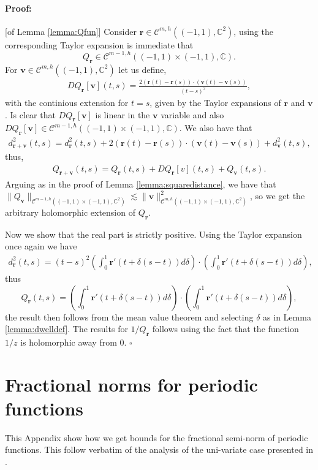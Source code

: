 \documentclass{article}
\newenvironment{proof}{\paragraph{Proof:}}{\hfill$\square$}
\newcommand{\IC}{{\mathbb C}}
\newcommand{\cmspaceh}[4]{\mathcal{C}^{#1,#2} \left( #3, #4 \right)}
\newcommand{\bv}{\bm{v}}
\newcommand{\br}{\bm{r}}
\newcommand{\iinterv}{(-1,1)\times(-1,1)}
\begin{document}
\begin{proof}[of Lemma \ref{lemma:Qfun}]
Consider $\br \in \cmspaceh{m}{h}{(-1,1)}{\IC^2}$, using the corresponding Taylor expansion is immediate that  $$Q_{\br} \in \cmspaceh{m-1}{h}{(-1,1)\times(-1,1)}{\IC}.$$  For $\bv \in \cmspaceh{m}{h}{(-1,1)}{\IC^2}$ let us define,
\begin{align*}
DQ_{\br}[\bv](t,s) = \frac{2 (\br(t)-\br(s))\cdot (\bv(t)-\bv(s))}{(t-s)^2}, 
\end{align*}
with the continious extension for $t=s$, given by the Taylor expansions of $\br$ and $\bv$. Is clear that $DQ_{\br}[\bv]$ is linear in the $\bv$ variable and also $DQ_{\br}[\bv] \in \cmspaceh{m-1}{h}{(-1,1)\times(-1,1)}{\IC}$. We also have that 
\begin{align*}
d_{\br +\bv}^2(t,s) = d^2_{\br}(t,s) + 2 (\br(t) -\br(s))\cdot (\bv(t)-\bv(s)) + d_{\bv}^2(t,s),
\end{align*}
thus, 
\begin{align*}
Q_{\br +\bv}(t,s) = Q_{\br}(t,s) + DQ_{\br}[v](t,s) + Q_{\bv}(t,s).
\end{align*}
Arguing as in the proof of Lemma \ref{lemma:squaredistance}, 
we have that $\| Q_{\bv}\|_{\cmspaceh{m-1}{h}{\iinterv}{\IC^2}} \lesssim \| \bv\|_{\cmspaceh{m}{h}{\iinterv}{\IC^2}}^2$, so we get the arbitrary holomorphic extension of $Q_{\br}$.

Now we show that the real part is strictly positive. Using the Taylor expansion once again we have 
\begin{align*}
d_{\br}^2(t,s) = (t-s)^2 \left(\int_{0}^1 \br'(t+\delta(s-t))d\delta \right) \cdot \left(\int_{0}^1 \br'(t+\delta(s-t))d\delta \right),
\end{align*}
thus 
$$
Q_{\br}(t,s) = \left(\int_{0}^1 \br'(t+\delta(s-t))d\delta \right) \cdot \left(\int_{0}^1 \br'(t+\delta(s-t))d\delta \right),
$$
the result then follows from the mean value theorem and selecting $\delta$ as in Lemma \ref{lemma:dwelldef}. The results for $1/Q_{\br}$  follows using the fact that the function $1/z$ is holomorphic away from 0.
\end{proof}

\section{Fractional norms for periodic functions}
\label{appendix:fracbivariate}
This Appendix show how we get bounds for the fractional semi-norm of periodic functions. This follow verbatim of the analysis of the uni-variate case presented in \cite[Theorem 8.6]{kress2013linear}. 
\end{document}
